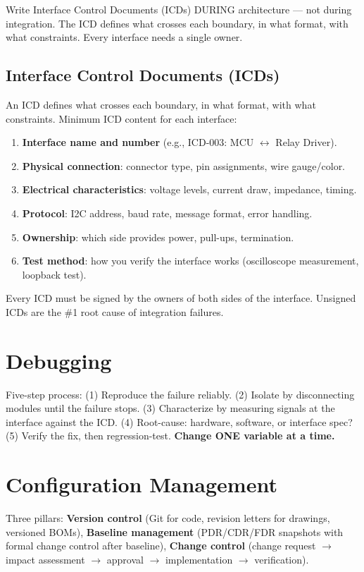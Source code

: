 \documentclass[11pt,letterpaper,twoside,openany]{book}
\begin{document}
Write Interface Control Documents (ICDs) DURING architecture — not during integration. The ICD defines what crosses each boundary, in what format, with what constraints. Every interface needs a single owner.


\subsection{Interface Control Documents (ICDs)}
An ICD defines what crosses each boundary, in what format, with what constraints. Minimum ICD content for each interface:
\begin{enumerate}[nosep,leftmargin=1.5em]
\item \textbf{Interface name and number} (e.g., ICD-003: MCU $\leftrightarrow$ Relay Driver).
\item \textbf{Physical connection}: connector type, pin assignments, wire gauge/color.
\item \textbf{Electrical characteristics}: voltage levels, current draw, impedance, timing.
\item \textbf{Protocol}: I2C address, baud rate, message format, error handling.
\item \textbf{Ownership}: which side provides power, pull-ups, termination.
\item \textbf{Test method}: how you verify the interface works (oscilloscope measurement, loopback test).
\end{enumerate}

Every ICD must be signed by the owners of both sides of the interface. Unsigned ICDs are the \#1 root cause of integration failures.

\section{Debugging}
Five-step process: (1) Reproduce the failure reliably. (2) Isolate by disconnecting modules until the failure stops. (3) Characterize by measuring signals at the interface against the ICD. (4) Root-cause: hardware, software, or interface spec? (5) Verify the fix, then regression-test. \textbf{Change ONE variable at a time.}

\section{Configuration Management}
Three pillars: \textbf{Version control} (Git for code, revision letters for drawings, versioned BOMs), \textbf{Baseline management} (PDR/CDR/FDR snapshots with formal change control after baseline), \textbf{Change control} (change request $\to$ impact assessment $\to$ approval $\to$ implementation $\to$ verification).
\end{document}
